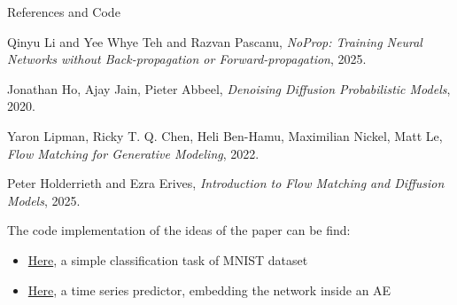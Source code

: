 \documentclass{beamer}
\begin{document}
\begin{frame}{References and Code}

\begin{thebibliography}{2}
     Qinyu Li and Yee Whye Teh and Razvan Pascanu, \emph{NoProp: Training Neural Networks without Back-propagation or Forward-propagation}, 2025.

     Jonathan Ho, Ajay Jain, Pieter Abbeel, \emph{Denoising Diffusion Probabilistic Models}, 2020.

     Yaron Lipman, Ricky T. Q. Chen, Heli Ben-Hamu, Maximilian Nickel, Matt Le, \emph{Flow Matching for Generative Modeling}, 2022.

     Peter Holderrieth and Ezra Erives, \emph{Introduction to Flow Matching and Diffusion Models}, 2025.

    
\end{thebibliography}

\vspace{0.5cm}  %



\normalsize  %

The code implementation of the ideas of the paper can be find:
\begin{itemize}
    \item \href{https://github.com/ivanbrillo/NoProp/blob/main/NoProp.ipynb}{Here}, a simple classification task of MNIST dataset
    \item \href{https://github.com/ivanbrillo/NoProp/blob/main/NoProp_TimeSeries.ipynb}{Here}, a  time series predictor, embedding the network inside an AE
    
\end{itemize}


\end{frame}
\end{document}
